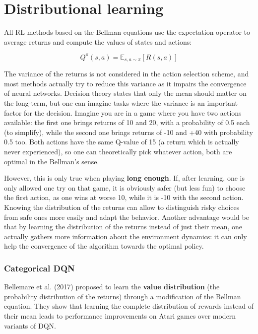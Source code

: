 \documentclass[
  letterpaper,
  DIV=11,
  numbers=noendperiod]{scrreprt}
\begin{document}

\hypertarget{distributional-learning}{%
\chapter{Distributional learning}\label{distributional-learning}}

All RL methods based on the Bellman equations use the expectation
operator to average returns and compute the values of states and
actions:

\[
    Q^\pi(s, a) = \mathbb{E}_{s, a \sim \pi}[R(s, a)]
\]

The variance of the returns is not considered in the action selection
scheme, and most methods actually try to reduce this variance as it
impairs the convergence of neural networks. Decision theory states that
only the mean should matter on the long-term, but one can imagine tasks
where the variance is an important factor for the decision. Imagine you
are in a game where you have two actions available: the first one brings
returns of 10 and 20, with a probability of 0.5 each (to simplify),
while the second one brings returns of -10 and +40 with probability 0.5
too. Both actions have the same Q-value of 15 (a return which is
actually never experienced), so one can theoretically pick whatever
action, both are optimal in the Bellman's sense.

However, this is only true when playing \textbf{long enough}. If, after
learning, one is only allowed one try on that game, it is obviously
safer (but less fun) to choose the first action, as one wins at worse
10, while it is -10 with the second action. Knowing the distribution of
the returns can allow to distinguish risky choices from safe ones more
easily and adapt the behavior. Another advantage would be that by
learning the distribution of the returns instead of just their mean, one
actually gathers more information about the environment dynamics: it can
only help the convergence of the algorithm towards the optimal policy.

\hypertarget{categorical-dqn}{%
\subsection{Categorical DQN}\label{categorical-dqn}}

Bellemare et al. (2017) proposed to learn the \textbf{value
distribution} (the probability distribution of the returns) through a
modification of the Bellman equation. They show that learning the
complete distribution of rewards instead of their mean leads to
performance improvements on Atari games over modern variants of DQN.
\end{document}
